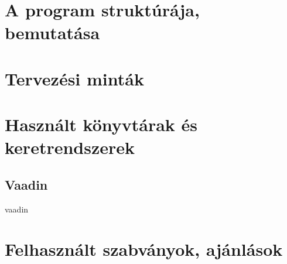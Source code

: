 \section{A program struktúrája, bemutatása}

\section{Tervezési minták}









\section{Használt könyvtárak és keretrendszerek}







\subsection{Vaadin}

vaadin

\section{Felhasznált szabványok, ajánlások}







